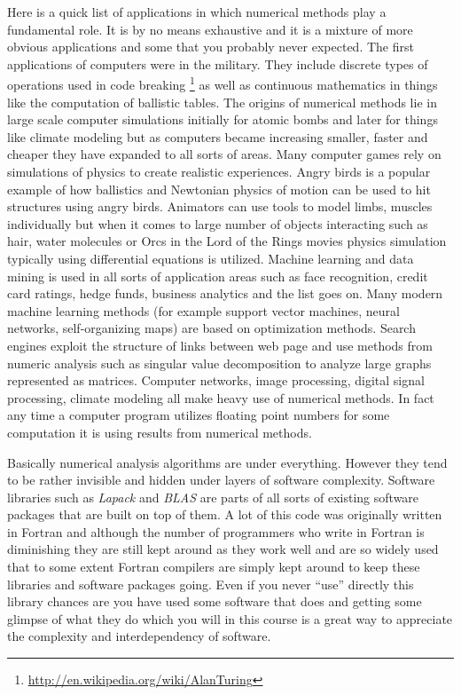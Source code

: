 \documentclass [titlepage,12pt,letter] {article}
\begin{document}
Here is a quick list of applications in which numerical methods play a
fundamental role. It is by no means exhaustive and it is a mixture of
more obvious applications and some that you probably never expected.
The first applications of computers were in the military. They include
discrete types of operations used in code breaking \footnote{\url{http://en.wikipedia.org/wiki/AlanTuring}} as well as continuous
mathematics in things like the computation of ballistic tables. The
origins of numerical methods lie in large scale computer simulations
initially for atomic bombs and later for things like climate modeling
but as computers became increasing smaller, faster and cheaper they
have expanded to all sorts of areas. Many computer games rely on
simulations of physics to create realistic experiences. Angry birds is
a popular example of how ballistics and Newtonian physics of motion
can be used to hit structures using angry birds. Animators
can use tools to model limbs, muscles individually but when it comes
to large number of objects interacting such as hair, water molecules
or Orcs in the Lord of the Rings movies physics simulation typically
using differential equations is utilized. Machine learning and data
mining is used in all sorts of application areas such as face
recognition, credit card ratings, hedge funds, business analytics and
the list goes on. Many modern machine learning methods (for example
support vector machines, neural networks, self-organizing maps) are
based on optimization methods.  Search engines exploit the structure
of links between web page and use methods from numeric analysis such
as singular value decomposition to analyze large graphs represented as
matrices. Computer networks, image processing, digital signal
processing, climate modeling all make heavy use of numerical
methods. In fact any time a computer program utilizes floating point
numbers for some computation it is using results from numerical
methods.

Basically numerical analysis algorithms are under everything. However
they tend to be rather invisible and hidden under layers of software
complexity. Software libraries such as {\it Lapack} and {\it BLAS}
are parts of all sorts of existing software packages that are built on
top of them. A lot of this code was originally written in Fortran and
although the number of programmers who write in Fortran is diminishing
they are still kept around as they work well and are so widely
used that to some extent Fortran compilers are simply kept around to
keep these libraries and software packages going. Even if you never
``use'' directly this library chances are you have used some software
that does and getting some glimpse of what they do which you will in
this course is a great way to appreciate the complexity and
interdependency of software. 
\end{document}
